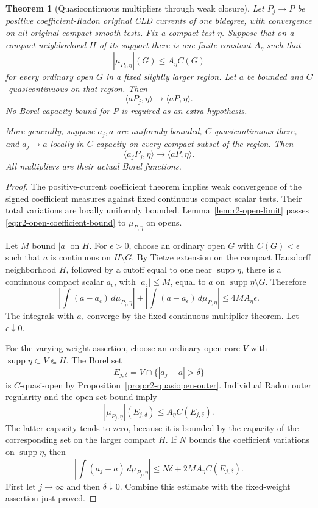 \documentclass[11pt,a4paper]{article}
\numberwithin{equation}{section}
\newtheorem{theorem}{Theorem}[section]
\theoremstyle{definition}
\theoremstyle{remark}
\begin{document}
\begin{theorem}[Quasicontinuous multipliers through weak closure]
\label{thm:r2-weak-closure-multipliers}
Let $P_j\to P$ be positive coefficient-Radon original CLD currents
of one bidegree, with convergence on all original compact smooth
tests. Fix a compact test $\eta$. Suppose that on a compact
neighborhood $H$ of its support there is one finite constant $A_\eta$
such that
\begin{equation}
\label{eq:r2-open-coefficient-bound}
 |\mu_{P_j,\eta}|(G)\leq A_\eta C(G)
\end{equation}
for every ordinary open $G$ in a fixed slightly larger region.
Let $a$ be bounded and $C$-quasicontinuous on that region. Then
\[
 \langle aP_j,\eta\rangle\longrightarrow\langle aP,\eta\rangle.
\]
No Borel capacity bound for $P$ is required as an extra hypothesis.

More generally, suppose $a_j,a$ are uniformly bounded,
$C$-quasicontinuous there, and $a_j\to a$ locally in $C$-capacity
on every compact subset of the region. Then
\[
 \langle a_jP_j,\eta\rangle\longrightarrow\langle aP,\eta\rangle.
\]
All multipliers are their actual Borel functions.
\end{theorem}

\begin{proof}
The positive-current coefficient theorem implies weak convergence
of the signed coefficient measures against fixed continuous compact
scalar tests. Their total variations are locally uniformly bounded.
Lemma~\ref{lem:r2-open-limit} passes
\eqref{eq:r2-open-coefficient-bound} to $\mu_{P,\eta}$ on opens.

Let $M$ bound $|a|$ on $H$. For $\epsilon>0$, choose an ordinary
open $G$ with $C(G)<\epsilon$ such that $a$ is continuous on
$H\setminus G$. By Tietze extension on the compact Hausdorff
neighborhood $H$, followed by a cutoff equal to one near
$\operatorname{supp}\eta$, there is a continuous compact scalar
$a_\epsilon$, with $|a_\epsilon|\leq M$, equal to $a$ on
$\operatorname{supp}\eta\setminus G$. Therefore
\[
 \left|\int(a-a_\epsilon)\,d\mu_{P_j,\eta}\right|
 +\left|\int(a-a_\epsilon)\,d\mu_{P,\eta}\right|
 \leq4M A_\eta\epsilon.
\]
The integrals with $a_\epsilon$ converge by the fixed-continuous
multiplier theorem. Let $\epsilon\downarrow0$.

For the varying-weight assertion, choose an ordinary open core
$V$ with $\operatorname{supp}\eta\subset V\Subset H$. The Borel
set
\[
 E_{j,\delta}=V\cap\{|a_j-a|>\delta\}
\]
is $C$-quasi-open by Proposition~\ref{prop:r2-quasiopen-outer}.
Individual Radon outer regularity and the open-set bound imply
\[
 |\mu_{P_j,\eta}|(E_{j,\delta})
       \leq A_\eta C(E_{j,\delta}).
\]
The latter capacity tends to zero, because it is bounded by the
capacity of the corresponding set on the larger compact $H$.
If $N$ bounds the coefficient variations on
$\operatorname{supp}\eta$, then
\[
 \left|\int(a_j-a)\,d\mu_{P_j,\eta}\right|
 \leq N\delta+2M A_\eta C(E_{j,\delta}).
\]
First let $j\to\infty$ and then $\delta\downarrow0$. Combine
this estimate with the fixed-weight assertion just proved.
\end{proof}
\end{document}
